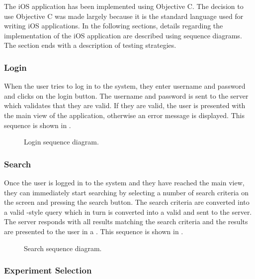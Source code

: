 The iOS application has been implemented using Objective C. The decision to use Objective C was made largely because it is the standard language used for writing iOS applications. 
In the following sections, details regarding the implementation of the iOS application are described using sequence diagrams. The section ends with a description of testing strategies.

\subsubsection{Login}

When the user tries to log in to the system, they enter username and password and clicks on the login button. The username and password is sent to the server which validates that they are valid. If they are valid, the user is presented with the main view of the application, otherwise an error message is displayed. This sequence is shown in  .

\begin{figure}[ht]
\caption{Login sequence diagram.}
\label{fig:ios_sequence_login}
\end{figure}

\subsubsection{Search}

Once the user is logged in to the system and they have reached the main view, they can immediately start searching by selecting a number of search criteria on the screen and pressing the search button. The search criteria are converted into a valid -style query which in turn is converted into a valid  and sent to the server. The server responds with all results matching the search criteria and the results are presented to the user in a . This sequence is shown in .

\begin{figure}[ht]
\caption{Search sequence diagram.}
\label{fig:ios_sequence_search}
\end{figure}

\subsubsection{Experiment Selection}

